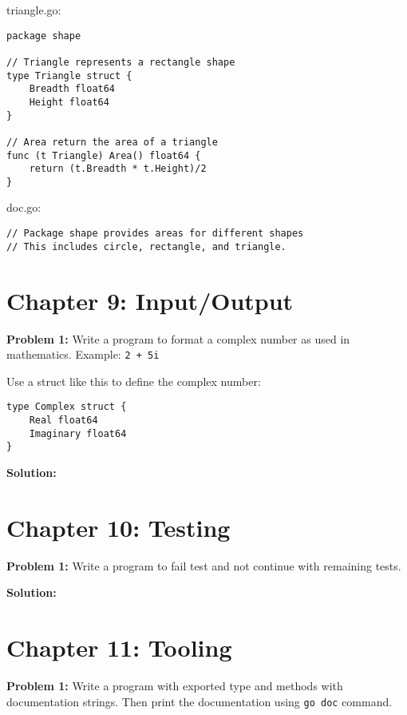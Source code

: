 triangle.go:

\begin{lstlisting}[numbers=none]
package shape

// Triangle represents a rectangle shape
type Triangle struct {
    Breadth float64
    Height float64
}

// Area return the area of a triangle
func (t Triangle) Area() float64 {
    return (t.Breadth * t.Height)/2
}
\end{lstlisting}

doc.go:

\begin{lstlisting}[numbers=none]
// Package shape provides areas for different shapes
// This includes circle, rectangle, and triangle.
\end{lstlisting}

\section*{Chapter 9: Input/Output}

\textbf{Problem 1:} Write a program to format a complex number as used in mathematics.  Example: \texttt{2 + 5i}

Use a struct like this to define the complex number:

\begin{lstlisting}[numbers=none]
type Complex struct {
    Real float64
    Imaginary float64
}
\end{lstlisting}

\textbf{Solution:}



\section*{Chapter 10: Testing}

\textbf{Problem 1:} Write a program to fail test and not continue with remaining tests.

\textbf{Solution:}



\section*{Chapter 11: Tooling}

{\bfseries Problem 1:} Write a program with exported type and methods
with documentation strings.  Then print the documentation
using \texttt{go doc} command.


